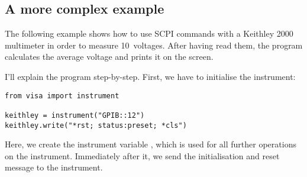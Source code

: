 \documentclass{howto}
\begin{document}
\subsection{A more complex example}
\label{sec:more-complex-example}

The following example shows how to use SCPI commands with a Keithley 2000
multimeter in order to measure 10~voltages.  After having read them, the
program calculates the average voltage and prints it on the screen.

I'll explain the program step-by-step.  First, we have to initialise the
instrument:
\begin{verbatim}
from visa import instrument

keithley = instrument("GPIB::12")
keithley.write("*rst; status:preset; *cls")
\end{verbatim}
Here, we create the instrument variable , which is used for all
further operations on the instrument.  Immediately after it, we send the
initialisation and reset message to the instrument.
\end{document}
